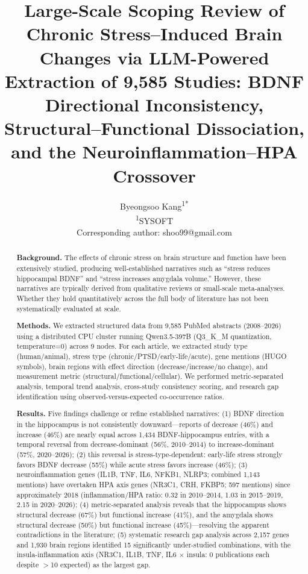 \documentclass[12pt,a4paper]{article}
\title{Large-Scale Scoping Review of Chronic Stress--Induced Brain Changes via LLM-Powered Extraction of 9,585 Studies: BDNF Directional Inconsistency, Structural--Functional Dissociation, and the Neuroinflammation--HPA Crossover}
\author{
Byeongsoo Kang\textsuperscript{1*}\\
\small\textsuperscript{1}SYSOFT\\
\small *Corresponding author: shoo99@gmail.com
}
\date{}
\begin{document}
\maketitle

\begin{abstract}
\textbf{Background.} The effects of chronic stress on brain structure and function have been extensively studied, producing well-established narratives such as ``stress reduces hippocampal BDNF'' and ``stress increases amygdala volume.'' However, these narratives are typically derived from qualitative reviews or small-scale meta-analyses. Whether they hold quantitatively across the full body of literature has not been systematically evaluated at scale.

\textbf{Methods.} We extracted structured data from 9,585 PubMed abstracts (2008--2026) using a distributed CPU cluster running Qwen3.5-397B (Q3\_K\_M quantization, temperature=0) across 9 nodes. For each article, we extracted study type (human/animal), stress type (chronic/PTSD/early-life/acute), gene mentions (HUGO symbols), brain regions with effect direction (decrease/increase/no change), and measurement metric (structural/functional/cellular). We performed metric-separated analysis, temporal trend analysis, cross-study consistency scoring, and research gap identification using observed-versus-expected co-occurrence ratios.

\textbf{Results.} Five findings challenge or refine established narratives: (1) BDNF direction in the hippocampus is not consistently downward---reports of decrease (46\%) and increase (46\%) are nearly equal across 1,434 BDNF-hippocampus entries, with a temporal reversal from decrease-dominant (56\%, 2010--2014) to increase-dominant (57\%, 2020--2026); (2) this reversal is stress-type-dependent: early-life stress strongly favors BDNF decrease (55\%) while acute stress favors increase (46\%); (3) neuroinflammation genes (IL1B, TNF, IL6, NFKB1, NLRP3; combined 1,143 mentions) have overtaken HPA axis genes (NR3C1, CRH, FKBP5; 597 mentions) since approximately 2018 (inflammation/HPA ratio: 0.32 in 2010--2014, 1.03 in 2015--2019, 2.15 in 2020--2026); (4) metric-separated analysis reveals that the hippocampus shows structural decrease (67\%) but functional increase (41\%), and the amygdala shows structural decrease (50\%) but functional increase (45\%)---resolving the apparent contradictions in the literature; (5) systematic research gap analysis across 2,157 genes and 1,930 brain regions identified 15 significantly under-studied combinations, with the insula-inflammation axis (NR3C1, IL1B, TNF, IL6 $\times$ insula: 0 publications each despite $>$10 expected) as the largest gap.


\end{abstract}
\end{document}

